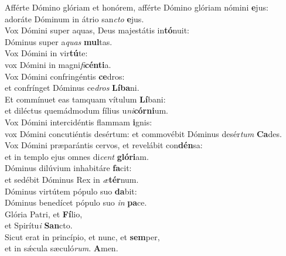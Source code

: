 \evenverse Afférte Dómino glóriam et honórem, afférte Dómino glóriam nómini \textbf{e}jus:~\*\\
\evenverse adoráte Dóminum in átrio san\textit{cto} \textbf{e}jus.\\
\oddverse Vox Dómini super aquas, Deus majestátis in\textbf{tó}nuit:~\*\\
\oddverse Dóminus super a\textit{quas} \textbf{mul}tas.\\
\evenverse Vox Dómini in vir\textbf{tú}te:~\*\\
\evenverse vox Dómini in magni\textit{fi}\textbf{cén}\textbf{ti}a.\\
\oddverse Vox Dómini confringéntis \textbf{ce}dros:~\*\\
\oddverse et confrínget Dóminus ce\textit{dros} \textbf{Lí}\textbf{ba}ni.\\
\evenverse Et commínuet eas tamquam vítulum \textbf{Lí}bani:~\*\\
\evenverse et diléctus quemádmodum fílius u\textit{ni}\textbf{cór}\textbf{ni}um.\\
\oddverse Vox Dómini intercidéntis flammam \textbf{i}gnis:~\*\\
\oddverse vox Dómini concutiéntis desértum: et commovébit Dóminus desér\textit{tum} \textbf{Ca}des.\\
\evenverse Vox Dómini præparántis cervos, et revelábit con\textbf{dén}sa:~\*\\
\evenverse et in templo ejus omnes di\textit{cent} \textbf{gló}\textbf{ri}am.\\
\oddverse Dóminus dilúvium inhabitáre \textbf{fa}cit:~\*\\
\oddverse et sedébit Dóminus Rex in \textit{æ}\textbf{tér}num.\\
\evenverse Dóminus virtútem pópulo suo \textbf{da}bit:~\*\\
\evenverse Dóminus benedícet pópulo suo \textit{in} \textbf{pa}ce.\\
\oddverse Glória Patri, et \textbf{Fí}lio,~\*\\
\oddverse et Spirítu\textit{i} \textbf{San}cto.\\
\evenverse Sicut erat in princípio, et nunc, et \textbf{sem}per,~\*\\
\evenverse et in sǽcula sæculó\textit{rum}. \textbf{A}men.\\
